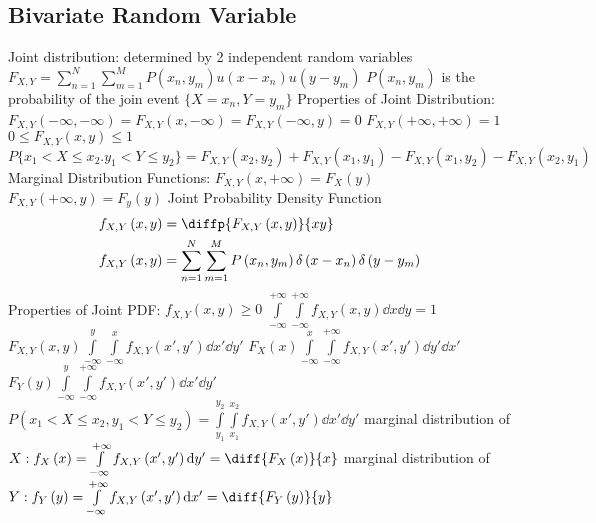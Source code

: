 \documentclass[a4paper,11pt]{article}
\begin{document}
	\subsection{Bivariate Random Variable}
	\begin{outline}[enumerate]
		\1 Joint distribution: determined by 2 independent random variables
			\2 $F_{X, Y} = \sum_{n = 1}^{N}\sum_{m = 1}^{M}P\left(x_{n}, y_{m}\right)u\left(x - x_{n}\right)u\left(y - y_{m}\right)$
			\2 $P\left(x_{n}, y_{m}\right)$ is the probability of the join event $\{X = x_{n}, Y = y_{m}\}$
		\1 Properties of Joint Distribution:
			\2 $F_{X, Y}\left(-\infty, -\infty\right) = F_{X, Y}\left(x, -\infty\right) = F_{X, Y}\left(-\infty, y\right) = 0$
			\2 $F_{X, Y}\left(+\infty, +\infty\right) = 1$
			\2 $0 \leq F_{X, Y}\left(x, y\right) \leq 1$
			\2 $P\{x_{1} < X \leq x_{2}. y_{1} < Y \leq y_{2}\} = F_{X, Y}\left(x_{2}, y_{2}\right) + F_{X, Y}\left(x_{1}, y_{1}\right) - F_{X, Y}\left(x_{1}, y_{2}\right) - F_{X, Y}\left(x_{2}, y_{1}\right)$	
			\2 Marginal Distribution Functions:
				\3 $F_{X, Y}\left(x, +\infty\right) = F_{X}(y)$
				\3 $F_{X, Y}\left(+\infty, y\right) = F_{y}(y)$	
		\1 Joint Probability Density Function
			\begin{align}
				f_{X, Y}\left(x, y\right) &= \diffp{F_{X, Y}\left(x, y\right)}{{x}{y}} \\
				f_{X, Y}\left(x, y\right) &= \sum_{n = 1}^{N}\sum_{m = 1}^{M}P\left(x_{n}, y_{m}\right)\delta \left(x - x_{n}\right)\delta \left(y - y_{m}\right)
			\end{align}		
		\1 Properties of Joint PDF:
			\2 $f_{X, Y}\left(x, y\right) \geq 0$
			\2 $\int\limits_{-\infty}^{+\infty} \int\limits_{-\infty}^{+\infty} f_{X, Y}\left(x, y\right) \dd x \dd y = 1$	
			\2 $F_{X, Y}\left(x, y\right) \int\limits_{-\infty}^{y} \int\limits_{-\infty}^{x} f_{X, Y}\left(x', y'\right) \dd x' \dd y'$
			\2 $F_{X}\left(x\right) \int\limits_{-\infty}^{x} \int\limits_{-\infty}^{+\infty} f_{X, Y}\left(x', y'\right) \dd y' \dd x'$
			\2 $F_{Y}\left(y\right) \int\limits_{-\infty}^{y} \int\limits_{-\infty}^{+\infty} f_{X, Y}\left(x', y'\right) \dd x' \dd y'$
			\2 $P\left(x_{1} < X \leq x_{2}, y_{1} < Y\leq y_{2}\right) = \int\limits_{y_{1}}^{y_{2}} \int\limits_{x_{1}}^{x_{2}} f_{X, Y}\left(x', y'\right) \dd x' \dd y'$
			\2 marginal distribution of $X: f_{X}\left(x\right) = \int\limits_{-\infty}^{+\infty} f_{X, Y}\left(x', y'\right) \dd y' = \diff{F_{X}\left(x\right)}{x}$
			\2 marginal distribution of $Y: f_{Y}\left(y\right) = \int\limits_{-\infty}^{+\infty} f_{X, Y}\left(x', y'\right) \dd x' = \diff{F_{Y}\left(y\right)}{y}$

\end{outline}
\end{document}
